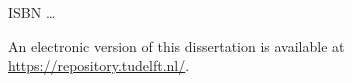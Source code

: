 \begin{titlepage}
\vspace{\bigskipamount}



\noindent
ISBN \ldots

\medskip
\noindent An electronic version of this dissertation is available at \\
\url{https://repository.tudelft.nl/}.

\end{titlepage}
